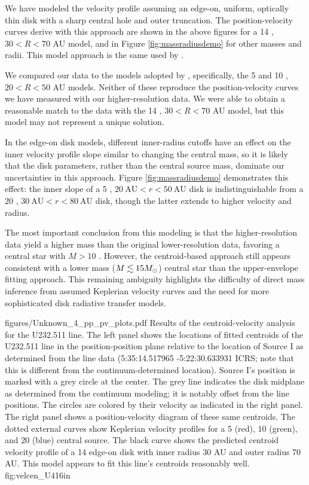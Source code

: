 \documentclass[twocolumn]{aastex61}
\begin{document}
We have modeled the velocity profile assuming an edge-on, uniform, optically
thin disk with a sharp central hole and outer truncation.  The
position-velocity curves derive with this approach are shown in the above
figures for a 14 \msun, $30 < R < 70$ AU model, and in Figure \ref{fig:massradiusdemo}
for other masses and radii.  This model approach is the same used by
\citet{Plambeck2016a}.

We compared our data to the models adopted by \citet{Plambeck2016a},
specifically, the 5 and 10 \msun, $20 < R < 50$ AU models.  Neither of these
reproduce the position-velocity curves we have measured with our
higher-resolution data.  We were able to obtain a reasonable match
to the data with the 14 \msun, $30 < R < 70$ AU  model, but this model
may not represent a unique solution.


In the edge-on disk models, different inner-radius cutoffs have an effect on
the inner velocity profile slope similar to changing the central mass, so it is
likely that the disk parameters, rather than the central source mass, dominate
our uncertainties in this approach.  
Figure \ref{fig:massradiusdemo} demonstrates this effect: the inner slope of
a 5 \msun, $20~\mathrm{AU} < r < 50~\mathrm{AU}$ disk is indistinguishable
from a 20 \msun , $30~\mathrm{AU} < r < 80~\mathrm{AU}$ disk, though the latter
extends to higher velocity and radius.

The most important conclusion from this modeling is that the higher-resolution
data yield a higher mass than the original lower-resolution data, favoring
a central star with $M>10$ \msun.  However, the centroid-based approach
still appears consistent with a lower mass ($M\lesssim15M_{\odot}$) central star
than the \citet{Seifried2016a} upper-envelope fitting approach.  This remaining
ambiguity highlights the difficulty of direct mass inference from assumed
Keplerian velocity curves and the need for more sophisticated disk radiative
transfer models.

\Figure
{figures/Unknown_4_pp_pv_plots.pdf}
{Results of the centroid-velocity analysis for the U232.511 line.
The left panel shows the locations of fitted centroids of the U232.511 line in
the position-position plane relative to the location of Source I as determined
from the line data (5:35:14.517965 -5:22:30.633931 ICRS; note that this is
different from the continuum-determined location).  Source I's position is
marked with a grey circle at the center.  The grey line indicates the disk
midplane as determined from the continuum modeling; it is notably offset from
the line positions.  The circles are colored by their velocity as indicated in
the right panel.  The right panel shows a position-velocity diagram of these
same centroids.  The dotted external curves show Keplerian velocity profiles
for a 5 (red), 10 (green), and 20 (blue) \msun central source.  The black
curve shows the predicted centroid velocity profile of a 14 \msun  edge-on disk
with inner radius 30 AU and outer radius 70 AU.
This model appears to fit this line's centroids reasonably well.
}
{fig:velcen_U4}{1}{6in}
\end{document}
